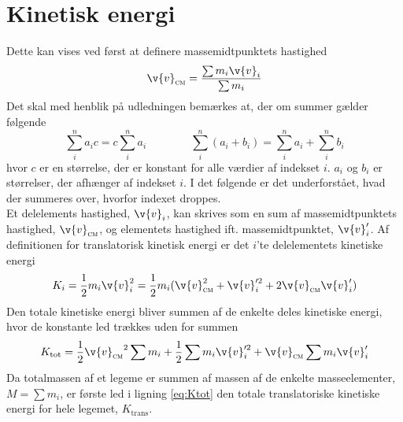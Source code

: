 \section{Kinetisk energi}
Dette kan vises ved først at definere massemidtpunktets hastighed
\begin{equation} \label{eq:v_cm}
    \v{v}_\textsc{cm}=\frac{\sum m_i\v{v}_i}{\sum m_i}
\end{equation}
Det skal med henblik på udledningen bemærkes at, der om summer gælder følgende
\begin{equation}
    \sum_i^n a_ic=c\sum_i^n a_i \qquad\qquad \sum_i^n\left(a_i + b_i\right) = \sum_i^n a_i + \sum_i^n b_i
\end{equation}
hvor $c$ er en størrelse, der er konstant for alle værdier af indekset $i$. $a_i$ og $b_i$ er størrelser, der afhænger af indekset $i$. I det følgende er det underforstået, hvad der summeres over, hvorfor indexet droppes. \\

Et delelements hastighed, $\v{v}_i$, kan skrives som en sum af massemidtpunktets hastighed, $\v{v}_\textsc{cm}$, og elementets hastighed ift. massemidtpunktet, $\v{v}_i'$. Af definitionen for translatorisk kinetisk energi er det $i$'te delelementets kinetiske energi
\begin{equation}
     K_i = \frac{1}{2}m_i\v{v}_i^2 = \frac{1}{2}m_i(\v{v}_\textsc{cm}^2+\v{v}_i'^2+2\v{v}_\textsc{cm}\v{v}_i')
\end{equation}
Den totale kinetiske energi bliver summen af de enkelte deles kinetiske energi, hvor de konstante led trækkes uden for summen
\begin{equation} \label{eq:Ktot}
    K_\text{tot} = \frac{1}{2}{\v{v}_\textsc{cm}}^2\sum m_i+\frac{1}{2}\sum m_i\v{v}_i'^2+\v{v}_\textsc{cm}\sum m_i\v{v}_i'
\end{equation}
Da totalmassen af et legeme er summen af massen af de enkelte masseelementer, $M=\sum m_i$, er første led i ligning \eqref{eq:Ktot} den totale translatoriske kinetiske energi for hele legemet, $K_\text{trans}$. \\

